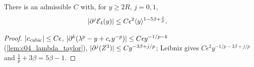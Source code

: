 \begin{proposition}[Control of $\mc E_4$]
  \label{prop:approx_E4}
  There is an admissible $C$ with, for $y\ge2R$, $j=0,1$,
  \begin{equation}\label{eqn:approx_E4_bound}
    |\partial^j\mathcal{E}_4(y)|\le C\epsilon^2\langle y \rangle^{1-5\beta+\frac jp}.
  \end{equation}
\end{proposition}
\begin{proof}
  $|c_{\textup{cubic}}|\le C\epsilon$, $|\partial^k(\lambda^p-y+c_\epsilon y^{-p})|\le C\epsilon y^{-1/p-k}$ (\cref{lem:c04_lambda_taylor}), $|\partial^j(Z^3)|\le Cy^{-3\beta+j/p}$;
  Leibniz gives $C\epsilon^2y^{-1/p-3\beta+j/p}$ and $\frac1p+3\beta=5\beta-1$.
\end{proof}
